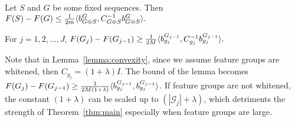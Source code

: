  


\begin{lemma}
  Let $S$ and $G$ be some fixed sequences. Then
  \mbox{$
    F(S) - F(G) \leq \frac{1}{2m} \langle b^G_{G \oplus S}, C_{G \oplus S}^{-1} b^G_{G\oplus S} \rangle.
  $}
  \label{lemma:smoothness}
\end{lemma}

\begin{lemma} For $j = 1,2,..., J$, 
    \mbox{$
      F(G_j) - F(G_{j-1}) \geq \frac{1}{2M} \langle  {b^{G_{j-1}}_{g_j}}, C_{g_j}^{-1}b^{G_{j-1}}_{g_j}  \rangle.
    $}
  \label{lemma:convexity}
\end{lemma}
Note that in Lemma~\ref{lemma:convexity}, since we assume feature groups are 
whitened, then $C_{g_j} = (1+\lambda) I$. The bound of the lemma becomes
$F(G_j) - F(G_{j-1}) \geq \frac{1}{2M (1+\lambda)} \langle  {b^{G_{j-1}}_{g_j}}, b^{G_{j-1}}_{g_j}  \rangle$. If feature groups are not whitened, 
the constant $(1+\lambda)$ can be scaled up to $(|\mathcal{G}_j| + \lambda)$, 
which detriments the strength of Theorem~\ref{thm:main} especially when feature 
groups are large. 


